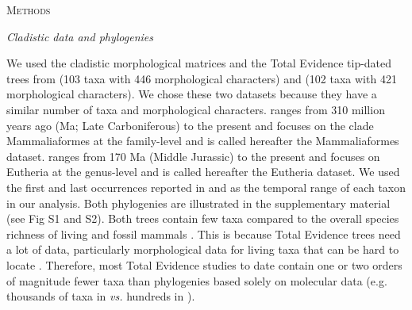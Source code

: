 \documentclass[12pt,letterpaper]{article}
\renewcommand{\section}[1]{%
\bigskip
\begin{center}
\begin{Large}
\normalfont\scshape #1
\medskip
\end{Large}
\end{center}}
\renewcommand{\subsection}[1]{%
\bigskip
\begin{center}
\begin{large}
\normalfont\itshape #1
\end{large}
\end{center}}
\begin{document}
%
%

\section{Methods}

\subsection{Cladistic data and phylogenies}
We used the cladistic morphological matrices and the Total Evidence tip-dated trees \cite{ronquista2012} from \cite{Slater2012MEE} (103 taxa with 446 morphological characters) and \cite{beckancient2014} (102 taxa with 421 morphological characters).
We chose these two datasets because they have a similar number of taxa and morphological characters.
\cite{Slater2012MEE} ranges from 310 million years ago (Ma; Late Carboniferous) to the present and focuses on the clade Mammaliaformes at the family-level and is called hereafter the Mammaliaformes dataset.
\cite{beckancient2014} ranges from 170 Ma (Middle Jurassic) to the present and focuses on Eutheria at the genus-level and is called hereafter the Eutheria dataset.
We used the first and last occurrences reported in \cite{Slater2012MEE} and \cite{beckancient2014} as the temporal range of each taxon in our analysis.
Both phylogenies are illustrated in the supplementary material (see Fig S1 and S2).
Both trees contain few taxa compared to the overall species richness of living and fossil mammals \cite{bininda2007delayed,archibald2011extinction}.
This is because Total Evidence trees need a lot of data, particularly morphological data for living taxa that can be hard to locate \cite{GuillermeCooper}.
Therefore, most Total Evidence studies to date contain one or two orders of magnitude fewer taxa than phylogenies based solely on molecular data (e.g. thousands of taxa in \cite{bininda2007delayed,meredithimpacts2011} \textit{vs.} hundreds in \cite{ronquista2012,Slater2012MEE,beckancient2014}).
\end{document}
